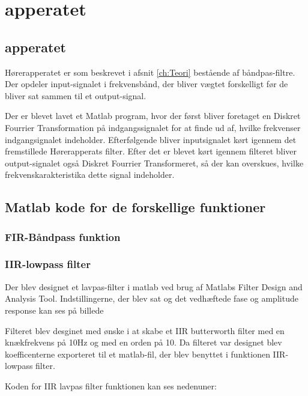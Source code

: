 \chapter{apperatet}\label{ch:apperatet}
\section{apperatet}
Hørerapperatet er som beskrevet i afsnit \ref{ch:Teori} bestående af båndpas-filtre. Der opdeler input-signalet i frekvensbånd, der bliver vægtet forskelligt før de bliver sat sammen til et output-signal.

Der er blevet lavet et Matlab program, hvor der først bliver foretaget en Diskret Fourrier Transformation på indgangssignalet for at finde ud af, hvilke frekvenser indgangsignalet indeholder.
Efterfølgende bliver inputsignalet kørt igennem det fremstillede Hørerapperats filter. Efter det er blevet kørt igennem filteret bliver output-signalet også Diskret Fourrier Transformeret, så der kan overskues, hvilke frekvenskarakteristika dette signal indeholder.
\section{Matlab kode for de forskellige funktioner}
\subsection{FIR-Båndpass funktion}
 
\subsection{IIR-lowpass filter}
Der blev designet et lavpas-filter i matlab ved brug af Matlabs Filter Design and Analysis Tool. Indstillingerne, der blev sat og det vedhæftede fase og amplitude response kan ses på billede 

Filteret blev desginet med ønske i at skabe et IIR butterworth filter med en knækfrekvens på 10Hz og med en orden på 10. 
Da filteret var designet blev koefficenterne exporteret til et matlab-fil, der blev benyttet i funktionen IIR-lowpass filter.

Koden for IIR lavpas filter funktionen kan ses nedenuner:

